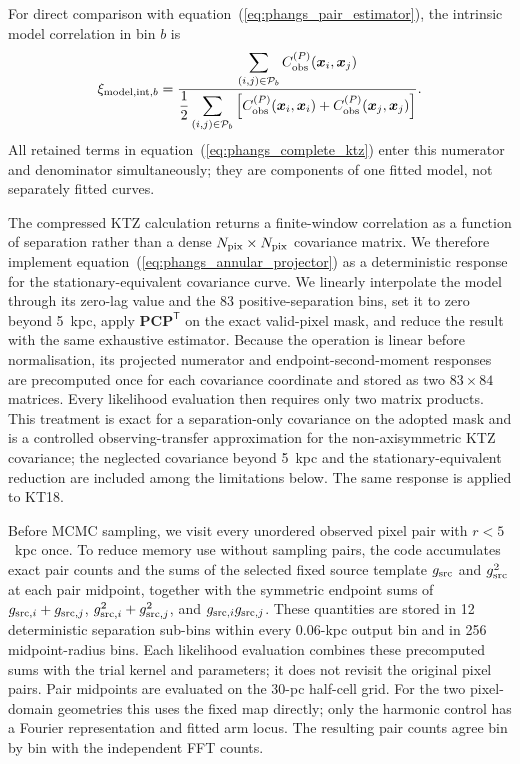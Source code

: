 \documentclass[fleqn,usenatbib]{mnras}
\newcommand{\bs}[1]{\boldsymbol{#1}}
\begin{document}
For direct comparison with equation~(\ref{eq:phangs_pair_estimator}), the intrinsic model correlation in bin $b$ is
\begin{equation}
    \xi_{{\rm model,int},b}=
    \frac{\displaystyle
    \sum_{(i,j)\in{\cal P}_b}C_{\rm obs}^{(P)}(\bs{x}_i,\bs{x}_j)}
    {\displaystyle\frac{1}{2}
    \sum_{(i,j)\in{\cal P}_b}
    \left[C_{\rm obs}^{(P)}(\bs{x}_i,\bs{x}_i)
    +C_{\rm obs}^{(P)}(\bs{x}_j,\bs{x}_j)\right]}.
    \label{eq:phangs_model_pair_average}
\end{equation}
All retained terms in equation~(\ref{eq:phangs_complete_ktz}) enter this numerator and denominator simultaneously; they are components of one fitted model, not separately fitted curves.

The compressed KTZ calculation returns a finite-window correlation as a function of separation rather than a dense $N_{\rm pix}\times N_{\rm pix}$ covariance matrix.  We therefore implement equation~(\ref{eq:phangs_annular_projector}) as a deterministic response for the stationary-equivalent covariance curve.  We linearly interpolate the model through its zero-lag value and the 83 positive-separation bins, set it to zero beyond 5~kpc, apply $\mathbf P\mathbf C\mathbf P^{\mathsf T}$ on the exact valid-pixel mask, and reduce the result with the same exhaustive estimator.  Because the operation is linear before normalisation, its projected numerator and endpoint-second-moment responses are precomputed once for each covariance coordinate and stored as two $83\times84$ matrices.  Every likelihood evaluation then requires only two matrix products.  This treatment is exact for a separation-only covariance on the adopted mask and is a controlled observing-transfer approximation for the non-axisymmetric KTZ covariance; the neglected covariance beyond 5~kpc and the stationary-equivalent reduction are included among the limitations below.  The same response is applied to KT18.

Before MCMC sampling, we visit every unordered observed pixel pair with $r<5$~kpc once.  To reduce memory use without sampling pairs, the code accumulates exact pair counts and the sums of the selected fixed source template $g_{\rm src}$ and $g_{\rm src}^2$ at each pair midpoint, together with the symmetric endpoint sums of $g_{{\rm src},i}+g_{{\rm src},j}$, $g_{{\rm src},i}^2+g_{{\rm src},j}^2$, and $g_{{\rm src},i}g_{{\rm src},j}$.  These quantities are stored in 12 deterministic separation sub-bins within every 0.06-kpc output bin and in 256 midpoint-radius bins.  Each likelihood evaluation combines these precomputed sums with the trial kernel and parameters; it does not revisit the original pixel pairs.  Pair midpoints are evaluated on the 30-pc half-cell grid.  For the two pixel-domain geometries this uses the fixed map directly; only the harmonic control has a Fourier representation and fitted arm locus.  The resulting pair counts agree bin by bin with the independent FFT counts.
\end{document}
